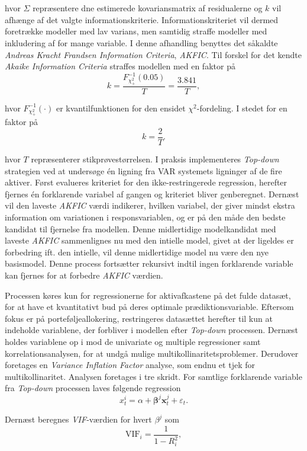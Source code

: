 \documentclass[
  a4paper,
  oneside]{memoir}
\begin{document}
hvor \(\hat{\Sigma}\) repræsentere dne estimerede kovariansmatrix af residualerne og \(k\) vil afhænge af det valgte informationskriterie. Informationskriteriet vil dermed foretrække modeller med lav varians, men samtidig straffe modeller med inkludering af for mange variable. I denne afhandling benyttes det såkaldte \emph{Andreas Kracht Frandsen Information Criteria}, \emph{AKFIC}. Til forskel for det kendte \emph{Akaike Information Criteria} straffes modellen med en faktor på
\[k=\frac{F^{-1}_{\chi_{+}^2}(0.05)}{T}=\frac{3.841}{T},\]

hvor \(F^{-1}_{\chi_{+}^2}(\cdot)\) er kvantilfunktionen for den ensidet \(\chi^2\)-fordeling. I stedet for en faktor på
\[k=\frac{2}{T}.\]

hvor \(T\) repræsenterer stikprøvestørrelsen. I praksis implementeres \emph{Top-down} strategien ved at undersøge én ligning fra VAR systemets ligninger af de fire aktiver. Først evalueres kriteriet for den ikke-restringerede regression, herefter fjernes én forklarende variabel af gangen og kriteriet bliver genberegnet. Dernæst vil den laveste \emph{AKFIC} værdi indikerer, hvilken variabel, der giver mindst ekstra information om variationen i responsvariablen, og er på den måde den bedste kandidat til fjernelse fra modellen. Denne midlertidige modelkandidat med laveste \emph{AKFIC} sammenlignes nu med den intielle model, givet at der ligeldes er forbedring ift. den intielle, vil denne midlertidige model nu være den nye basismodel. Denne process fortsætter rekursivt indtil ingen forklarende variable kan fjernes for at forbedre \emph{AKFIC} værdien.

Processen køres kun for regressionerne for aktivafkastene på det fulde datasæt, for at have et kvantitativt bud på deres optimale prædiktionsvariable. Eftersom fokus er på porteføljeallokering, restringeres datasættet herefter til kun at indeholde variablene, der forbliver i modellen efter \emph{Top-down} processen. Dernæst holdes variablene op i mod de univariate og multiple regressioner samt korrelationsanalysen, for at undgå mulige multikollinaritetsproblemer. Derudover foretages en \emph{Variance Inflation Factor} analyse, som endnu et tjek for multikollinaritet. Analysen foretages i tre skridt. For samtlige forklarende variable fra \emph{Top-down} processen laves følgende regression
\begin{equation}
x_t^i=\alpha+\bm{\beta}^j\bm{x}_t^{j}+\varepsilon_t. \label{eq:vifanareg}
\end{equation}

Dernæst beregnes \emph{VIF}-værdien for hvert \(\beta^j\) som
\[\text{VIF}_i=\frac{1}{1-R_i^2},\]
\end{document}
